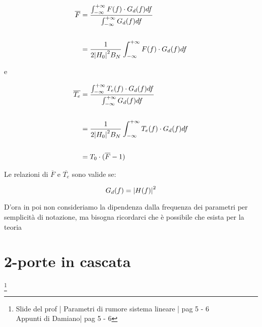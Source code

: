 {
    \Large 
    \begin{equation}
        \begin{split}
            \overline{F}
            &= 
            \frac{\int_{-\infty}^{+\infty} F(f) \cdot G_d (f) df}{\int_{-\infty}^{+\infty} G_d (f) df}
            \\
            &\quad
            \\
            &= 
            \frac{1}{2 \abs{H_0}^{2} B_N} \int_{-\infty}^{+\infty} F(f) \cdot G_d (f) df
        \end{split}
    \end{equation}
}

e 

{
    \Large 
    \begin{equation}
        \begin{split}
            \overline{T_e}
            &=
            \frac{\int_{-\infty}^{+ \infty} T_e (f) \cdot G_d (f) df}{\int_{-\infty}^{+ \infty} G_d (f) df} 
            \\
            &\quad
            \\
            &=
            \frac{1}{2 \abs{H_0}^{2} B_N} \int_{-\infty}^{+ \infty} T_e (f) \cdot G_d (f) df
            \\
            &\quad
            \\
            &= 
            T_0 \cdot (\overline{F} - 1)
        \end{split} 
    \end{equation}
}

Le relazioni di $\overline{F}$ e $\overline{T_e}$ sono valide se: 

{
    \Large 
    \begin{equation}
        G_d (f) = \abs{H(f)}^{2}
    \end{equation}
}

\begin{tcolorbox}
    D'ora in poi non consideriamo la dipendenza dalla frequenza dei parametri per semplicità di notazione, 
    ma bisogna ricordarci che è possibile che esista per la teoria
\end{tcolorbox}

\newpage 

\section{2-porte in cascata}
\footnote{Slide del prof | Parametri di rumore sistema lineare | pag 5 - 6\\  
Appunti di Damiano| pag 5 - 6} 

